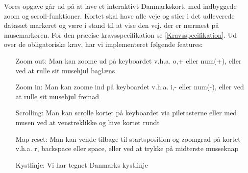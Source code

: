 Vores opgave går ud på at lave et interaktivt Danmarkskort, med indbyggede zoom og scroll-funktioner. Kortet skal have alle veje og stier i det udleverede datasæt markeret og være i stand til at vise den vej, der er nærmest på musemarkøren. For den præcise kravsspecifikation se \ref{Kravsspecifikation}.
\newline \newline
Ud over de obligatoriske krav, har vi implementeret følgende features:
\begin{itemize}
	\item [Zoom out:] Man kan zoome ud på keyboardet v.h.a. o,+ eller num(+), eller ved at rulle sit musehjul baglæns
	\item [Zoom in:] Man kan zoome ind på keyboardet v.h.a. i,- eller num(-), eller ved at rulle sit musehjul fremad
	\item [Scrolling:] Man kan scrolle kortet på keyboardet via piletasterne eller med musen ved at venstreklikke og hive kortet rundt
	\item [Map reset:] Man kan vende tilbage til startsposition og zoomgrad på kortet v.h.a. r, backspace eller space, eller ved at trykke på midterste musseknap
	\item [Kystlinje:] Vi har tegnet Danmarks kystlinje
\end{itemize}